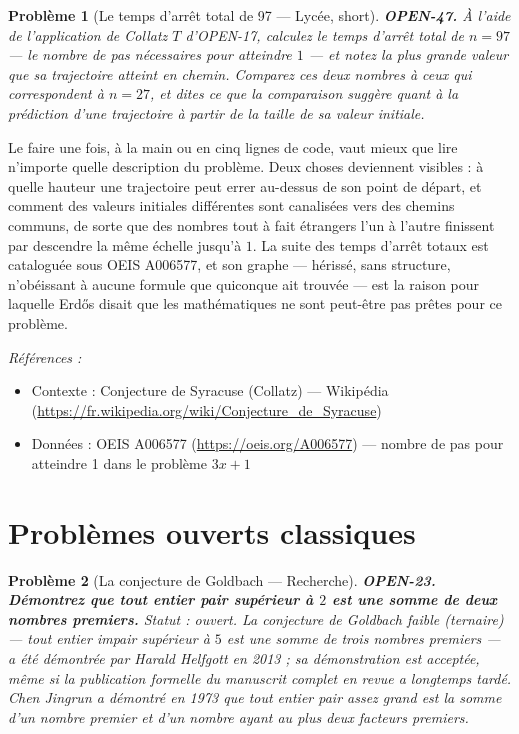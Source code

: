 \documentclass[11pt]{article}
\newtheorem{problem}{Problème}
\newenvironment{refs}{\par\small\noindent\emph{Références :}\begin{itemize}\setlength\itemsep{0pt}}{\end{itemize}\normalsize}
\begin{document}
\bigskip

\begin{problem}[{Le temps d'arrêt total de 97 --- Lycée, short}]
\textbf{OPEN-47.} À l'aide de l'application de Collatz $ T $
d'OPEN-17, calculez le temps d'arrêt total de $ n = 97 $ --- le nombre de pas nécessaires
pour atteindre $ 1 $ --- et notez la plus grande valeur que sa trajectoire atteint en
chemin. Comparez ces deux nombres à ceux qui correspondent à $ n = 27 $, et dites ce que
la comparaison suggère quant à la prédiction d'une trajectoire à partir de la taille de sa
valeur initiale.
\end{problem}

\noindent Le faire une fois, à la main ou en cinq lignes de code, vaut mieux que
lire n'importe quelle description du problème. Deux choses deviennent visibles : à quelle
hauteur une trajectoire peut errer au-dessus de son point de départ, et comment des
valeurs initiales différentes sont canalisées vers des chemins communs, de sorte que des
nombres tout à fait étrangers l'un à l'autre finissent par descendre la même échelle
jusqu'à $ 1 $. La suite des temps d'arrêt totaux est cataloguée sous OEIS A006577, et
son graphe --- hérissé, sans structure, n'obéissant à aucune formule que quiconque ait
trouvée --- est la raison pour laquelle Erd\H{o}s disait que les mathématiques ne sont
peut-être pas prêtes pour ce problème.

\begin{refs}
\item Contexte : Conjecture de Syracuse (Collatz) --- Wikipédia (\url{https://fr.wikipedia.org/wiki/Conjecture_de_Syracuse})
\item Données : OEIS A006577 (\url{https://oeis.org/A006577}) --- nombre de pas pour atteindre 1 dans le problème $ 3x+1 $
\end{refs}

\bigskip


\section*{Problèmes ouverts classiques}

\begin{problem}[{La conjecture de Goldbach --- Recherche}]
\textbf{OPEN-23.} \textbf{Démontrez que tout entier pair supérieur à
$ 2 $ est une somme de deux nombres premiers.} Statut : ouvert. La conjecture de
Goldbach \textit{faible} (ternaire) --- tout entier impair supérieur à $ 5 $ est une somme
de trois nombres premiers --- a été démontrée par Harald Helfgott en 2013 ; sa démonstration
est acceptée, même si la publication formelle du manuscrit complet en revue a longtemps
tardé. Chen Jingrun a démontré en 1973 que tout entier pair assez grand est la somme d'un
nombre premier et d'un nombre ayant au plus deux facteurs premiers.
\end{problem}
\end{document}
